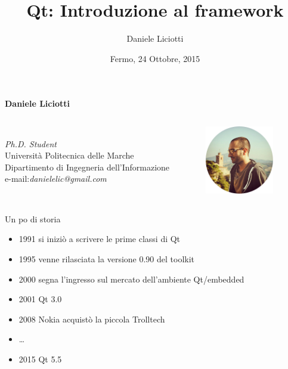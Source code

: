 \documentclass[10pt, aspectratio=169]{beamer}
\title{Qt: Introduzione al framework}
\subtitle{}
\author{Daniele Liciotti}
\institute{ICT Engineer and PhD Student}
\date{Fermo, 24 Ottobre, 2015}
\begin{document}
\maketitle
\begin{frame}
	\begin{block}{\textbf{Daniele Liciotti}}
		\begin{columns}
			\vspace{1cm}\\
			\emph{Ph.D. Student}\\
			Università Politecnica delle Marche\\
			Dipartimento di Ingegneria dell'Informazione\\
			
			\vspace{1cm}
			e-mail:\qquad \emph{danielelic@gmail.com}
			\begin{figure}
				\centering
				\includegraphics[height=3cm]{images/me.png}
			\end{figure}
		\end{columns}
	\end{block}
\end{frame}

\begin{frame}{Un po di storia}
	\begin{itemize}
		\item 1991 si iniziò a scrivere le prime classi di Qt
		\item 1995 venne rilasciata la versione 0.90 del toolkit
		\item 2000 segna l'ingresso sul mercato dell'ambiente Qt/embedded
		\item 2001 Qt 3.0
		\item 2008 Nokia acquistò la piccola Trolltech
		\item \dots
		\item 2015 Qt 5.5
	\end{itemize}
\end{frame}
\end{document}
